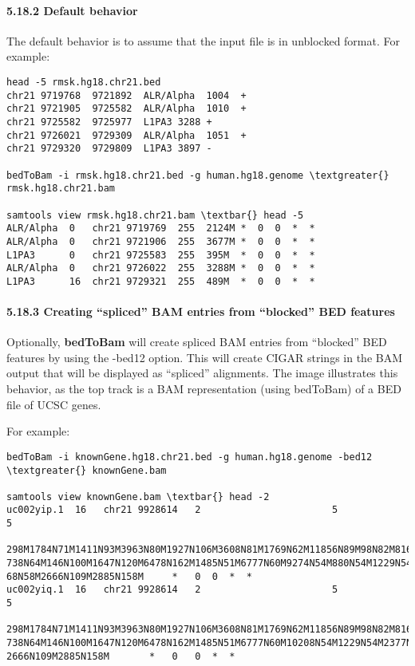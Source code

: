 \documentclass[letterpaper,10pt,english]{sphinxmanual}
\begin{document}
\paragraph{5.18.2 Default behavior}
\label{content/bedToBam:default-behavior}
The default behavior is to assume that the input file is in unblocked format. For example:

\begin{Verbatim}[commandchars=\\\{\}]
head -5 rmsk.hg18.chr21.bed
chr21 9719768  9721892  ALR/Alpha  1004  +
chr21 9721905  9725582  ALR/Alpha  1010  +
chr21 9725582  9725977  L1PA3 3288 +
chr21 9726021  9729309  ALR/Alpha  1051  +
chr21 9729320  9729809  L1PA3 3897 -

bedToBam -i rmsk.hg18.chr21.bed -g human.hg18.genome \textgreater{} rmsk.hg18.chr21.bam

samtools view rmsk.hg18.chr21.bam \textbar{} head -5
ALR/Alpha  0   chr21 9719769  255  2124M *  0  0  *  *
ALR/Alpha  0   chr21 9721906  255  3677M *  0  0  *  *
L1PA3      0   chr21 9725583  255  395M  *  0  0  *  *
ALR/Alpha  0   chr21 9726022  255  3288M *  0  0  *  *
L1PA3      16  chr21 9729321  255  489M  *  0  0  *  *
\end{Verbatim}


\paragraph{5.18.3 Creating ``spliced'' BAM entries from ``blocked'' BED features}
\label{content/bedToBam:creating-spliced-bam-entries-from-blocked-bed-features}
Optionally, \textbf{bedToBam} will create spliced BAM entries from ``blocked'' BED features by using the
-bed12 option. This will create CIGAR strings in the BAM output that will be displayed as ``spliced''
alignments. The image illustrates this behavior, as the top track is a BAM representation (using
bedToBam) of a BED file of UCSC genes.

For example:

\begin{Verbatim}[commandchars=\\\{\}]
bedToBam -i knownGene.hg18.chr21.bed -g human.hg18.genome -bed12 \textgreater{} knownGene.bam

samtools view knownGene.bam \textbar{} head -2
uc002yip.1  16   chr21 9928614   2                       5                        5

298M1784N71M1411N93M3963N80M1927N106M3608N81M1769N62M11856N89M98N82M816N61M6910N65M
738N64M146N100M1647N120M6478N162M1485N51M6777N60M9274N54M880N54M1229N54M2377N54M112
68N58M2666N109M2885N158M     *   0  0  *  *
uc002yiq.1  16   chr21 9928614   2                       5                        5

298M1784N71M1411N93M3963N80M1927N106M3608N81M1769N62M11856N89M98N82M816N61M6910N65M
738N64M146N100M1647N120M6478N162M1485N51M6777N60M10208N54M1229N54M2377N54M11268N58M
2666N109M2885N158M       *   0   0  *  *
\end{Verbatim}
\end{document}

